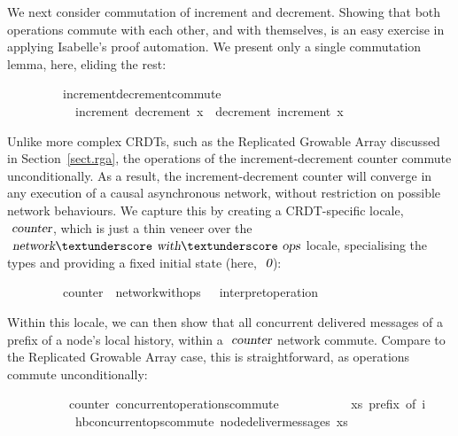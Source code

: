 We next consider commutation of increment and decrement.
Showing that both operations commute with each other, and with themselves, is an easy exercise in applying Isabelle's proof automation.
We present only a single commutation lemma, here, eliding the rest:
\vspace{0.375em}
\begin{isabellebody}
\ \ \ \ \ \ \ \ \ increment{\isacharunderscore}decrement{\isacharunderscore}commute{\isacharcolon}\isanewline
\ \ \ \ \ \ \ \ \ \ \ {\isachardoublequoteopen}increment\ {\isacharparenleft}decrement\ x{\isacharparenright}\ {\isacharequal}\ decrement\ {\isacharparenleft}increment\ x{\isacharparenright}{\isachardoublequoteclose}
\end{isabellebody}
\vspace{0.375em}
Unlike more complex CRDTs, such as the Replicated Growable Array discussed in Section~\ref{sect.rga}, the operations of the increment-decrement counter commute unconditionally.
As a result, the increment-decrement counter will converge in any execution of a causal asynchronous network, without restriction on possible network behaviours.
We capture this by creating a CRDT-specific locale, $\isa{counter}$, which is just a thin veneer over the $\isa{network}{\isacharunderscore}\isa{with}{\isacharunderscore}\isa{ops}$ locale, specialising the types and providing a fixed initial state (here, $\isa{0}$):
\vspace{0.375em}
\begin{isabellebody}
\ \ \ \ \ \ \ \ \ counter\ {\isacharequal}\ network{\isacharunderscore}with{\isacharunderscore}ops\ {\isacharunderscore}\ {\isacharunderscore}\ interpret{\isacharunderscore}operation\ {}
\end{isabellebody}
\vspace{0.375em}
Within this locale, we can then show that all concurrent delivered messages of a prefix of a node's local history, within a $\isa{counter}$ network commute.
Compare to the Replicated Growable Array case, this is straightforward, as operations commute unconditionally:
\vspace{0.375em}
\begin{isabellebody}
\ \ \ \ \ \ \ \ \ {\isacharparenleft}\ counter{\isacharparenright}\ concurrent{\isacharunderscore}operations{\isacharunderscore}commute{\isacharcolon}\isanewline
\ \ \ \ \ \ \ \ \ \ \ {\isachardoublequoteopen}xs\ prefix\ of\ i{\isachardoublequoteclose}\isanewline
\ \ \ \ \ \ \ \ \ \ \ {\isachardoublequoteopen}hb{\isachardot}concurrent{\isacharunderscore}ops{\isacharunderscore}commute\ {\isacharparenleft}node{\isacharunderscore}deliver{\isacharunderscore}messages\ xs{\isacharparenright}{\isachardoublequoteclose}
\end{isabellebody}
